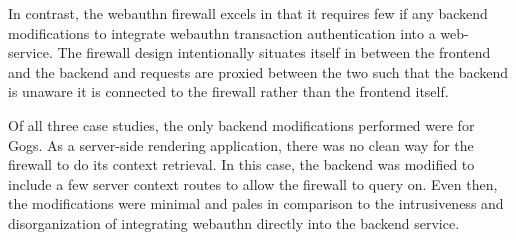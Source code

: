 In contrast, the webauthn firewall excels in that it requires few if any backend modifications to integrate webauthn transaction authentication into a web-service. The firewall design intentionally situates itself in between the frontend and the backend and requests are proxied between the two such that the backend is unaware it is connected to the firewall rather than the frontend itself.

Of all three case studies, the only backend modifications performed were for Gogs. As a server-side rendering application, there was no clean way for the firewall to do its context retrieval. In this case, the backend was modified to include a few server context routes to allow the firewall to query on. Even then, the modifications were minimal and pales in comparison to the intrusiveness and disorganization of integrating webauthn directly into the backend service.

\iffalse
The requests that need to be webauthn verified, the engineer must specify their authentication message format. 

is reconfigured to issue backend requests to the IP address

Upon opening the web page, requests are issued from the web-browser

has two options to specify how a route gets verified.

This message should encapsulate 

also included in the request and the associated signature is valid.
\fi
